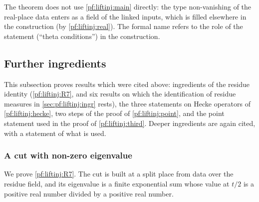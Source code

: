 \begin{remark}\label{pf:liftinj:pointrem}
The theorem does not use \cref{pf:liftinj:main} directly: the type non-vanishing of the real-place data enters as a field of the linked inputs, which
is filled elsewhere in the construction (by \cref{pf:liftinj:real}). The formal name refers to the role of the statement (``theta conditions'') in the
construction.
\end{remark}

\subsection{Further ingredients}\label{sec:pf:liftinj:further}

This subsection proves results which were cited above: ingredients of the residue identity (\ref{pf:liftinj:R7}, and six results on which the
identification of residue measures in \cref{sec:pf:liftinj:ingr} rests), the three statements on Hecke operators of \cref{pf:liftinj:hecke}, two steps
of the proof of \cref{pf:liftinj:point}, and the point statement used in the proof of \cref{pf:liftinj:third}. Deeper ingredients are again cited,
with a statement of what is used.

\subsubsection{A cut with non-zero eigenvalue}\label{sec:pf:liftinj:jp}

We prove \ref{pf:liftinj:R7}. The cut is built at a split place from data over the residue field, and its eigenvalue is a
finite exponential sum whose value at $t/2$ is a positive real number divided by a positive real number.

